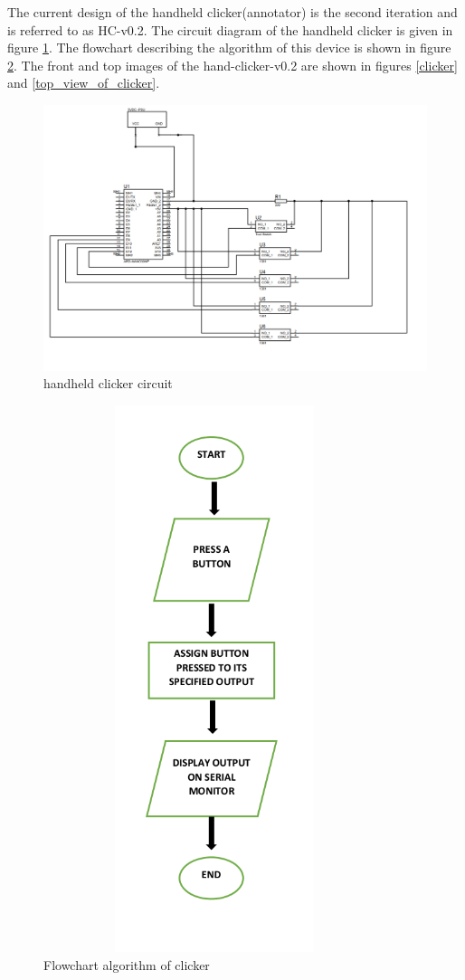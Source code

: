 \documentclass[10pt]{article}
\begin{document}
The current design of the handheld clicker(annotator) is the second iteration and is referred 
to as HC-v0.2. 
The circuit diagram of the handheld clicker is given in figure \ref{clicker_circuit}.
The flowchart describing the algorithm of this device is shown in figure \ref{clicker_flowchart}. 
The front and top images of the hand-clicker-v0.2 are shown in figures \ref{clicker} and 
\ref{top_view_of_clicker}.
\begin{figure}[H]
  \includegraphics[width=16cm]{../../../hardware/handheld_clicker/circuit_image.png}
  \caption{handheld clicker circuit}\label{clicker_circuit}
\end{figure}
\begin{figure}[H]
  \includegraphics[height=16cm,width=10cm]{../../../hardware/handheld_clicker/flowchart.png}
  \caption{Flowchart algorithm of clicker}\label{clicker_flowchart}
\end{figure}
\end{document}
